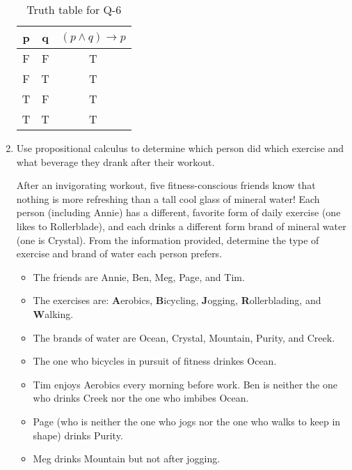 \documentclass{article}
\begin{document}
\begin{enumerate}
        \begin{table} [H]
                \centering
                \begin{tabular}{ | c | c | c | }
                \hline
                \textbf{p} & \textbf{q} & \textbf{$(p \wedge q) \rightarrow p$} \\ [0.5 ex]
                \hline 
                F & F & T \\
                \hline
                F & T & T \\
                \hline
                T & F & T \\
                \hline
                T & T & T \\ [1ex]
                \hline
                \end{tabular}
                \caption{Truth table for Q-6}
                \label {table:6}
        \end{table}

\item   Use propositional calculus to determine which person did which
        exercise and what beverage they drank after their workout.
        \par
        {\sffamily After an invigorating workout, five fitness-conscious
        friends know that nothing is more refreshing than a tall cool
        glass of mineral water!  Each person (including Annie) has a
        different, favorite form of daily exercise (one likes to
        Rollerblade), and each drinks a different form brand of mineral
        water (one is Crystal).  From the information provided,
        determine the type of exercise and brand of water each person
        prefers.
        \begin{itemize}
        \item   The friends are Annie, Ben, Meg, Page, and Tim.
        \item   The exercises are: \textbf{A}erobics, \textbf{B}icycling,
                \textbf{J}ogging, \textbf{R}ollerblading, and
                \textbf{W}alking.
        \item   The brands of water are Ocean, Crystal, Mountain,
                Purity, and Creek.
        \item   The one who bicycles in pursuit of fitness drinkes Ocean.
        \item   Tim enjoys Aerobics every morning before work.
                Ben is neither the one who drinks Creek nor the one who
                imbibes Ocean.
        \item   Page (who is neither the one who jogs nor the one who
                walks to keep in shape) drinks Purity.
        \item   Meg drinks Mountain but not after jogging.
        \end{itemize}}


\end{enumerate}
\end{document}
